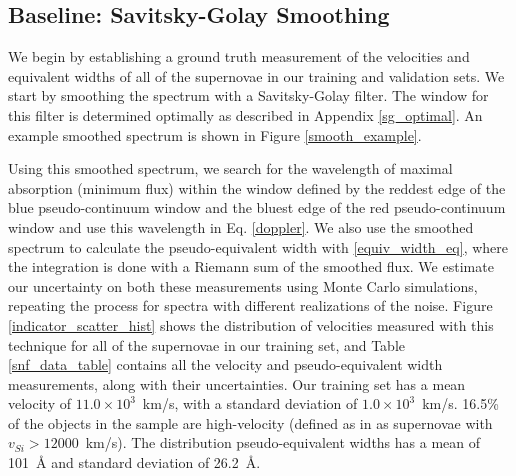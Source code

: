 \subsection{Baseline: Savitsky-Golay Smoothing}
We begin by establishing a ground truth measurement of the velocities and equivalent widths of all of the supernovae in our training and validation sets. We start by smoothing the spectrum with a Savitsky-Golay filter. The window for this filter is determined optimally as described in Appendix \ref{sg_optimal}. An example smoothed spectrum is shown in Figure \ref{smooth_example}.

Using this smoothed spectrum, we search for the wavelength of maximal absorption (minimum flux) within the window defined by the reddest edge of the blue pseudo-continuum window and the bluest edge of the red pseudo-continuum window and use this wavelength in Eq. \ref{doppler}. We also use the smoothed spectrum to calculate the pseudo-equivalent width with \ref{equiv_width_eq}, where the integration is done with a Riemann sum of the smoothed flux. We estimate our uncertainty on both these measurements using Monte Carlo simulations, repeating the process for spectra with different realizations of the noise. Figure \ref{indicator_scatter_hist} shows the distribution of velocities measured with this technique for all of the supernovae in our training set, and Table \ref{snf_data_table} contains all the velocity and pseudo-equivalent width measurements, along with their uncertainties. Our training set has a mean velocity of $11.0 \times 10^3$~km/s, with a standard deviation of $1.0 \times 10^3$~km/s. 16.5\% of the objects in the sample are high-velocity (defined as in \cite{wang_evidence_2013} as supernovae with $v_{Si}>12000$~km/s). The distribution pseudo-equivalent widths has a mean of 101~\AA{} and standard deviation of 26.2~\AA{}.

